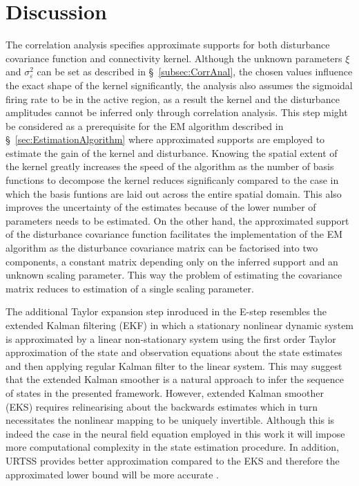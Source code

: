 \documentclass[]{article}
\begin{document}
\section{Discussion}
The correlation analysis specifies approximate supports for both disturbance covariance function and connectivity kernel. Although the unknown parameters $\xi$ and $\sigma_{\varepsilon}^2$ can be set as described in \S~\ref{subsec:CorrAnal}, the chosen values influence the exact shape of the kernel significantly, the analysis also assumes the sigmoidal firing rate to be in the active region, as a result  the kernel and the disturbance amplitudes cannot be inferred only through correlation analysis. This step might be considered as a prerequisite for the EM algorithm described in \S~\ref{sec:EstimationAlgorithm} where approximated supports are employed to estimate the gain of the kernel and disturbance. Knowing the spatial extent of the kernel greatly increases the speed of the algorithm as the number of basis functions to decompose the kernel reduces significanly compared to the case in which the basis funtions are laid out across the entire spatial domain. This also improves the uncertainty of the estimates because of the lower number of parameters needs to be estimated. On the other hand, the approximated support of the disturbance covariance function facilitates the implementation of the EM algorithm as the disturbance covariance matrix can be factorised into two components, a constant matrix depending only on the inferred support and an unknown scaling parameter. This way the problem of estimating the covariance matrix reduces to estimation of a single scaling parameter.

The additional Taylor expansion step inroduced in the E-step resembles the extended Kalman filtering (EKF) \cite{Jazwinski1970,Chui2009} in which a stationary nonlinear dynamic system is approximated by a linear non-stationary system using the first order Taylor approximation of the state and observation equations about the state estimates and then applying regular Kalman filter to the linear system. This may suggest that the extended Kalman smoother is a natural approach to infer the sequence of states in the presented framework. However, extended Kalman smoother (EKS) requires relinearising about the backwards estimates which in turn necessitates the nonlinear mapping to be uniquely invertible. Although this is indeed the case in the neural field equation employed in this work it will impose more computational complexity in the state estimation procedure. In addition, URTSS provides better approximation compared to the EKS and therefore the approximated lower bound will be more accurate \cite{Haykin2001}.
\end{document}
